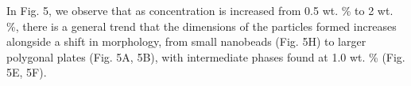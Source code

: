 \documentclass[a4paper,12pt,twocolumn]{article}
\begin{document}
  	\begin{figure}[h]
  	\noindent%
	\begin{minipage}{\linewidth}%
	\end{minipage}
	\end{figure}
  	
	
  	
  	In Fig. 5, we observe that as concentration is increased from 0.5 wt. \% to 2 wt. \%, there is a general trend that the dimensions of the particles formed increases alongside a shift in morphology, from small nanobeads (Fig. 5H) to larger polygonal plates (Fig. 5A, 5B), with intermediate phases found at 1.0 wt. \% (Fig. 5E, 5F). 
  		
\end{document}
